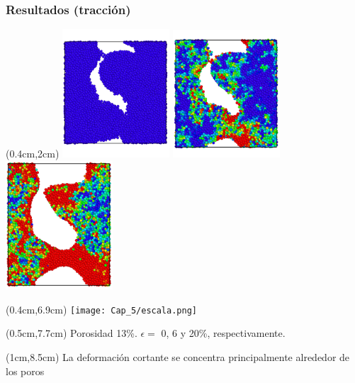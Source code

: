\begin{frame}
    \frametitle{Resultados (tracci\'on)}
    \begin{textblock*}{12cm}(0.4cm,2cm) %
        \includegraphics[width=4cm]{Presentacion_PANACM_Franco/13_0strain.png}
        \includegraphics[width=4cm]{Presentacion_PANACM_Franco/13_6strain_tens.png}
        \includegraphics[width=4cm]{Presentacion_PANACM_Franco/13_20strain_tens_2.png}
    \end{textblock*}
    \begin{textblock*}{12cm}(0.4cm,6.9cm)
     \centering
        \texttt{[image: Cap\_5/escala.png]}
    \end{textblock*}
    \begin{textblock*}{12cm}(0.5cm,7.7cm)
        \centering
        \scriptsize{Porosidad 13\%. $\epsilon=$ 0, 6 y 20\%, respectivamente.}
    \end{textblock*}
    \begin{textblock*}{11.5cm}(1cm,8.5cm) %
    \centering
	La deformaci\'on cortante se concentra principalmente alrededor de los poros
    \end{textblock*}
\end{frame}

